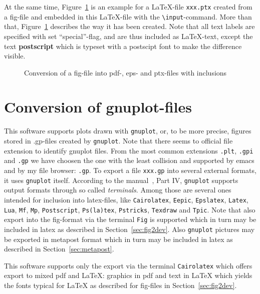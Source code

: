 \documentclass[12pt]{book}
\begin{document}
At the same time, Figure~\ref{fig:fig2dev} is an example 
for a \LaTeX-file {\tt xxx.ptx} created from a fig-file 
and embedded in this \LaTeX-file 
with the {\tt\textbackslash input}-command. 
More than that, 
Figure~\ref{fig:fig2dev} describes the way it has been created. 
Note that all text labels are specified with set ``special''-flag, 
and are thus included as \LaTeX-text, 
except the text {\bf\tiny postscript} 
which is typeset with a postscipt font to make the difference visible. 


\begin{figure}[htb]
\begin{center}

\end{center}
\caption{\label{fig:fig2dev}Conversion of a fig-file 
into pdf-, eps- and ptx-files with inclusions}
\end{figure}


\section{Conversion of gnuplot-files}\label{sec:gnuplot2pdf}

This software supports plots drawn with {\tt gnuplot}, or, to be more precise, 
figures stored in .gp-files created by {\tt gnuplot}. 
Note that there seems to official file extension 
to identify gnuplot files. 
From the most common extensions {\tt.plt}, {\tt.gpi} and {\tt.gp} 
we have choosen the one with the least collision 
and supported by emacs and by my file browser: {\tt.gp}. 
To export a file {\tt xxx.gp} into several external formats, 
it uses {\tt gnuplot} itself. 
According to the manual~\cite{GnuPlot}, Part IV, 
{\tt gnuplot} supports output formats through so called {\em terminals}. 
Among those are several ones intended for inclusion into latex-files, 
like {\tt Cairolatex}, {\tt Eepic}, {\tt Epslatex}, {\tt Latex}, {\tt Lua}, 
{\tt Mf}, {\tt Mp}, {\tt Postscript}, {\tt Ps(la)tex}, {\tt Pstricks}, 
{\tt Texdraw} and {\tt Tpic}. 
Note that also export into the fig-format via the terminal {\tt Fig} 
is supported which in turn may be included in latex 
as described in Section~\ref{sec:fig2dev}. 
Also {\tt gnuplot} pictures may be exported in metapost format 
which in turn may be included in latex 
as described in Section~\ref{sec:metapost}. 

This software supports only the export via the terminal {\tt Cairolatex} 
which offers export to mixed pdf and \LaTeX: 
graphics in pdf and text in \LaTeX{}
which yields the fonts typical for \LaTeX{} 
as described for fig-files in Section~\ref{sec:fig2dev}. 
\end{document}
